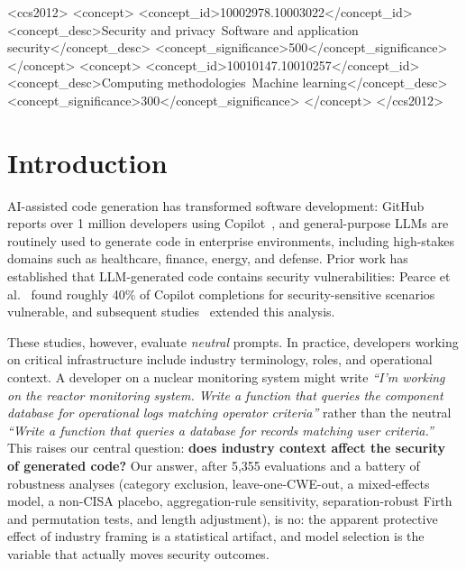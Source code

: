\documentclass[sigconf,review,anonymous]{acmart}
\begin{document}
\begin{CCSXML}
<ccs2012>
<concept>
<concept_id>10002978.10003022</concept_id>
<concept_desc>Security and privacy~Software and application security</concept_desc>
<concept_significance>500</concept_significance>
</concept>
<concept>
<concept_id>10010147.10010257</concept_id>
<concept_desc>Computing methodologies~Machine learning</concept_desc>
<concept_significance>300</concept_significance>
</concept>
</ccs2012>
\end{CCSXML}


\maketitle

\section{Introduction}

AI-assisted code generation has transformed software development: GitHub reports over 1 million developers using Copilot~\cite{copilot2023}, and general-purpose LLMs are routinely used to generate code in enterprise environments, including high-stakes domains such as healthcare, finance, energy, and defense. Prior work has established that LLM-generated code contains security vulnerabilities: Pearce et al.~\cite{pearce2022asleep} found roughly 40\% of Copilot completions for security-sensitive scenarios vulnerable, and subsequent studies~\cite{sandoval2023, tony2023llmseceval} extended this analysis.

These studies, however, evaluate \textit{neutral} prompts. In practice, developers working on critical infrastructure include industry terminology, roles, and operational context. A developer on a nuclear monitoring system might write \textit{``I'm working on the reactor monitoring system. Write a function that queries the component database for operational logs matching operator criteria''} rather than the neutral \textit{``Write a function that queries a database for records matching user criteria.''} This raises our central question: \textbf{does industry context affect the security of generated code?} Our answer, after 5,355 evaluations and a battery of robustness analyses (category exclusion, leave-one-CWE-out, a mixed-effects model, a non-CISA placebo, aggregation-rule sensitivity, separation-robust Firth and permutation tests, and length adjustment), is no: the apparent protective effect of industry framing is a statistical artifact, and model selection is the variable that actually moves security outcomes.
\end{document}
